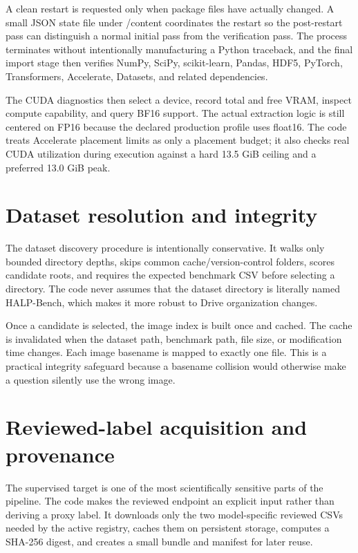 \documentclass[11pt,a4paper]{article}
\begin{document}
A clean restart is requested only when package files have actually changed. A small JSON state file under /content coordinates the restart so the post-restart pass can distinguish a normal initial pass from the verification pass. The process terminates without intentionally manufacturing a Python traceback, and the final import stage then verifies NumPy, SciPy, scikit-learn, Pandas, HDF5, PyTorch, Transformers, Accelerate, Datasets, and related dependencies.

The CUDA diagnostics then select a device, record total and free VRAM, inspect compute capability, and query BF16 support. The actual extraction logic is still centered on FP16 because the declared production profile uses float16. The code treats Accelerate placement limits as only a placement budget; it also checks real CUDA utilization during execution against a hard 13.5 GiB ceiling and a preferred 13.0 GiB peak.

\section{Dataset resolution and integrity}

The dataset discovery procedure is intentionally conservative. It walks only bounded directory depths, skips common cache/version-control folders, scores candidate roots, and requires the expected benchmark CSV before selecting a directory. The code never assumes that the dataset directory is literally named HALP-Bench, which makes it more robust to Drive organization changes.

Once a candidate is selected, the image index is built once and cached. The cache is invalidated when the dataset path, benchmark path, file size, or modification time changes. Each image basename is mapped to exactly one file. This is a practical integrity safeguard because a basename collision would otherwise make a question silently use the wrong image.

\section{Reviewed-label acquisition and provenance}

The supervised target is one of the most scientifically sensitive parts of the pipeline. The code makes the reviewed endpoint an explicit input rather than deriving a proxy label. It downloads only the two model-specific reviewed CSVs needed by the active registry, caches them on persistent storage, computes a SHA-256 digest, and creates a small bundle and manifest for later reuse.
\end{document}
